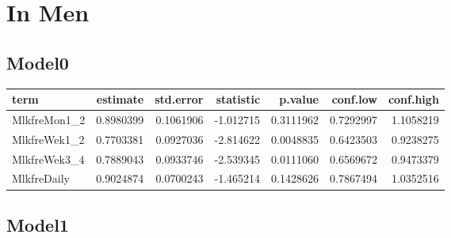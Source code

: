 \documentclass[]{article}
\newenvironment{Shaded}{\begin{snugshade}}{\end{snugshade}}
\newcommand{\DataTypeTok}[1]{\textcolor[rgb]{0.13,0.29,0.53}{#1}}
\newcommand{\KeywordTok}[1]{\textcolor[rgb]{0.13,0.29,0.53}{\textbf{#1}}}
\newcommand{\NormalTok}[1]{#1}
\newcommand{\OperatorTok}[1]{\textcolor[rgb]{0.81,0.36,0.00}{\textbf{#1}}}
\newcommand{\OtherTok}[1]{\textcolor[rgb]{0.56,0.35,0.01}{#1}}
\newcommand{\StringTok}[1]{\textcolor[rgb]{0.31,0.60,0.02}{#1}}
\begin{document}
\hypertarget{in-men}{%
\section{In Men}\label{in-men}}

\hypertarget{model0}{%
\subsection{Model0}\label{model0}}

\begin{Shaded}
\end{Shaded}

\begin{longtable}[]{@{}lrrrrrr@{}}
\toprule
term & estimate & std.error & statistic & p.value & conf.low &
conf.high\tabularnewline
\midrule
\endhead
MlkfreMon1\_2 & 0.8980399 & 0.1061906 & -1.012715 & 0.3111962 &
0.7292997 & 1.1058219\tabularnewline
MlkfreWek1\_2 & 0.7703381 & 0.0927036 & -2.814622 & 0.0048835 &
0.6423503 & 0.9238275\tabularnewline
MlkfreWek3\_4 & 0.7889043 & 0.0933746 & -2.539345 & 0.0111060 &
0.6569672 & 0.9473379\tabularnewline
MlkfreDaily & 0.9024874 & 0.0700243 & -1.465214 & 0.1428626 & 0.7867494
& 1.0352516\tabularnewline
\bottomrule
\end{longtable}

\hypertarget{model1}{%
\subsection{Model1}\label{model1}}

\begin{Shaded}
\end{Shaded}
\end{document}
